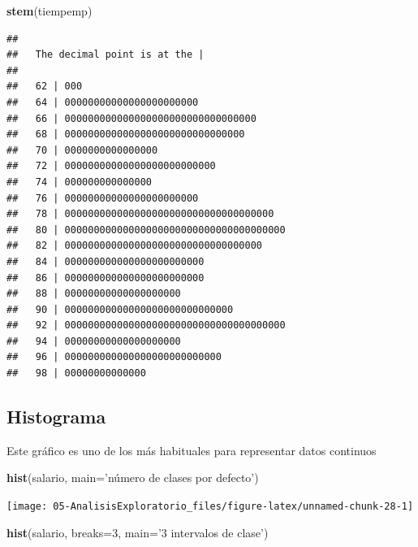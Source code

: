 \documentclass[]{book}
\newenvironment{Shaded}{\begin{snugshade}}{\end{snugshade}}
\newcommand{\DataTypeTok}[1]{\textcolor[rgb]{0.13,0.29,0.53}{#1}}
\newcommand{\DecValTok}[1]{\textcolor[rgb]{0.00,0.00,0.81}{#1}}
\newcommand{\KeywordTok}[1]{\textcolor[rgb]{0.13,0.29,0.53}{\textbf{#1}}}
\newcommand{\NormalTok}[1]{#1}
\newcommand{\StringTok}[1]{\textcolor[rgb]{0.31,0.60,0.02}{#1}}
\begin{document}
\begin{Shaded}
\begin{Highlighting}[]
\KeywordTok{stem}\NormalTok{(tiempemp)}
\end{Highlighting}
\end{Shaded}

\begin{verbatim}
## 
##   The decimal point is at the |
## 
##   62 | 000
##   64 | 00000000000000000000000
##   66 | 000000000000000000000000000000000
##   68 | 0000000000000000000000000000000
##   70 | 0000000000000000
##   72 | 00000000000000000000000000
##   74 | 000000000000000
##   76 | 00000000000000000000000
##   78 | 000000000000000000000000000000000000
##   80 | 00000000000000000000000000000000000000
##   82 | 0000000000000000000000000000000000
##   84 | 000000000000000000000000
##   86 | 000000000000000000000000
##   88 | 00000000000000000000
##   90 | 00000000000000000000000000000
##   92 | 00000000000000000000000000000000000000
##   94 | 00000000000000000000
##   96 | 000000000000000000000000000
##   98 | 00000000000000
\end{verbatim}

\hypertarget{histograma}{%
\subsection{Histograma}\label{histograma}}

Este gráfico es uno de los más habituales para representar datos continuos

\begin{Shaded}
\begin{Highlighting}[]
\KeywordTok{hist}\NormalTok{(salario, }\DataTypeTok{main=}\StringTok{'número de clases por defecto'}\NormalTok{)}
\end{Highlighting}
\end{Shaded}

\begin{center}\texttt{[image: 05-AnalisisExploratorio\_files/figure-latex/unnamed-chunk-28-1]} \end{center}

\begin{Shaded}
\begin{Highlighting}[]
\KeywordTok{hist}\NormalTok{(salario, }\DataTypeTok{breaks=}\DecValTok{3}\NormalTok{, }\DataTypeTok{main=}\StringTok{'3 intervalos de clase'}\NormalTok{)}
\end{Highlighting}
\end{Shaded}
\end{document}
